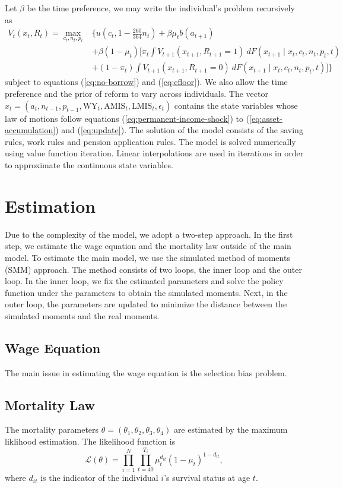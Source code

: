 \documentclass[12pt]{article}
\begin{document}
\begin{CJK*}{UTF8}{bsmi}
Let \(\beta\) be the time preference, we may write the 
individual's problem recursively as
\begin{equation}
    \begin{split}
        V_t(x_t,R_t) = \max_{c_t,n_t,p_t}& \biggl\{u(c_t,1-\frac{260}{364}n_t) + \beta\mu_tb(a_{t+1}) \\
        &+ \beta(1-\mu_t)\biggl[\pi_t\int V_{t+1}(x_{t+1},R_{t+1}=1)\:dF(x_{t+1}\mid x_t,c_t,n_t,p_t,t) \\
        &+ (1-\pi_t)\int V_{t+1}(x_{t+1},R_{t+1}=0)\:dF(x_{t+1}\mid x_t,c_t,n_t,p_t,t)\biggr] \biggr\}
    \end{split}
\end{equation}
subject to equations (\ref{eq:no-borrow}) and 
(\ref{eq:cfloor}). We also allow the time preference and the 
prior of reform to vary across individuals. The vector 
\(x_t=\left(a_t,n_{t-1},p_{t-1},\text{WY}_t, \text{AMIS}_t,
\text{LMIS}_t,\epsilon_t\right)\) contains the state variables 
whose law of motions follow equations 
(\ref{eq:permanent-income-shock}) to 
(\ref{eq:asset-accumulation}) and (\ref{eq:update}). The 
solution of the model consists of the saving rules, work 
rules and pension application rules. The model is solved 
numerically using value function iteration. Linear 
interpolations are used in iterations in order to approximate 
the continuous state variables.


\section{Estimation}
Due to the complexity of the model, we adopt a two-step 
approach. In the first step, we estimate the wage equation 
and the mortality law outside of the main model. To estimate 
the main model, we use the simulated method of moments (SMM) 
approach. The method consists of two loops, the inner loop 
and the outer loop. In the inner loop, we fix the estimated 
parameters and solve the policy function under the parameters 
to obtain the simulated moments. Next, in the outer loop, the 
parameters are updated to minimize the distance between the 
simulated moments and the real moments. 

\subsection{Wage Equation} 
The main issue in estimating the wage equation is the 
selection bias problem. 

\subsection{Mortality Law} 
The mortality parameters $\theta = (\theta_1, \theta_2, 
\theta_3, \theta_4)$ are estimated by the maximum liklihood 
estimation. The likelihood function is 
\begin{equation}
    \mathcal{L}(\theta) = \prod_{i=1}^N\prod_{t=40}^{T_i}\mu_t^{d_{it}}(1-\mu_t)^{1-d_{it}},
\end{equation}
where \(d_{it}\) is the indicator of the individual \(i\)'s 
survival status at age \(t\). 


\end{CJK*}
\end{document}
